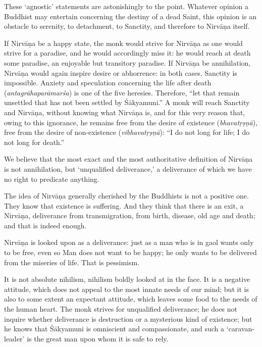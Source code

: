 \documentclass[a4paper, 11pt, oneside, english, landscape]{article}
\begin{document}
These `agnostic' statements are astonishingly to the point. Whatever opinion a Buddhist may entertain concerning the destiny of a dead Saint, this opinion is an obstacle to serenity, to detachment, to Sanctity, and therefore to Nirvāṇa itself.

If Nirvāṇa be a happy state, the monk would strive for Nirvāṇa as one would strive for a paradise, and he would accordingly miss it: he would reach at death some paradise, an enjoyable but transitory paradise. If Nirvāṇa be annihilation, Nirvāṇa would again inspire desire or abhorrence: in both cases, Sanctity is impossible. Anxiety and speculation concerning the life after death (\emph{antagrāhaparāmarśa}) is one of the five heresies. Therefore, ``let that remain unsettled that has not been settled by Śākyamuni.'' A monk will reach Sanctity and Nirvāṇa, without knowing what Nirvāṇa is, and for this very reason that, owing to this ignorance, he remains free from the desire of existence (\emph{bhavatṛṣṇā}), free from the desire of non-existence (\emph{vibhavatṛṣṇā}): ``I do not long for life; I do not long for death.''

We believe that the most exact and the most authoritative definition of Nirvāṇa is not annihilation, but `unqualified deliverance,' a deliverance of which we have no right to predicate anything.

The idea of Nirvāṇa generally cherished by the Buddhists is not a positive one. They know that existence is suffering. And they think that there is an exit, a Nirvāṇa, deliverance from transmigration, from birth, disease, old age and death; and that is indeed enough.

Nirvāṇa is looked upon as a deliverance: just as a man who is in gaol wants only to be free, even so Man does not want to be happy; he only wants to be delivered from the miseries of life. That is pessimism.

It is not absolute nihilism, nihilism boldly looked at in the face. It is a negative attitude, which does not appeal to the most innate needs of our mind; but it is also to some extent an expectant attitude, which leaves some food to the needs of the human heart. The monk strives for unqualified deliverance; he does not inquire whether deliverance is destruction or a mysterious kind of existence; but he knows that Śākyamuni is omniscient and compassionate, and such a `caravan-leader' is the great man upon whom it is safe to rely.

\subsection{}
\end{document}
